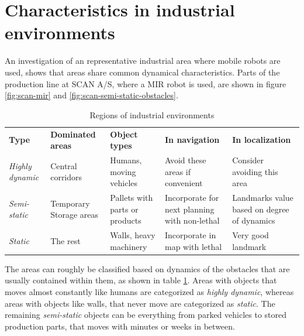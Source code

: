 \section{Characteristics in industrial environments}
\label{characteristics_in_industrial_environments}
An investigation of an representative industrial area where mobile robots are used, shows that areas share common dynamical characteristics. Parts of the production line at SCAN A/S, where a MIR robot is used, are shown in figure \ref{fig:scan-mir} and \ref{fig:scan-semi-static-obstacles}.

\begin{table}[htbp]
	\caption{Regions of industrial environments}
	\label{tab:regions_of_industrial_environments}
	\begin{center}
		\begin{tabular}{p{} | p{2.6cm} | p{2.6cm} | p{2.6cm} | p{2.6cm}}
			\toprule
			\textbf{Type} & \textbf{Dominated areas} & \textbf{Object types} & \textbf{In navigation} & \textbf{In localization} \\ 
			\rowcolor[gray]{0.925}
			\textit{Highly dynamic} & Central corridors & Humans, moving vehicles & Avoid these areas if convenient & Consider avoiding this area \\
			\textit{Semi-static} & Temporary Storage areas & Pallets with parts or products & Incorporate for next planning with non-lethal & Landmarks value based on degree of dynamics \\ 
			\rowcolor[gray]{0.925}
			\textit{Static} & The rest & Walls, heavy machinery & Incorporate in map with lethal & Very good landmark \\			
			\bottomrule
		\end{tabular} 
	\end{center}
\end{table}

The areas can roughly be classified based on dynamics of the obstacles that are usually contained within them, as shown in table \ref{tab:regions_of_industrial_environments}. Areas with objects that moves almost constantly like humans are categorized as \textit{highly dynamic}, whereas areas with objects like walls, that never move are categorized as \textit{static}. The remaining \textit{semi-static} objects can be everything from parked vehicles to stored production parts, that moves with minutes or weeks in between. 


